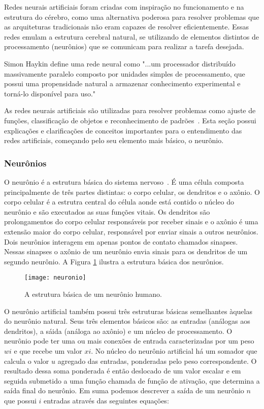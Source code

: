 Redes neurais artificiais foram criadas com inspiração no funcionamento e na estrutura do cérebro, como uma alternativa poderosa para resolver problemas que as arquiteturas tradicionais não eram capazes de resolver eficientemente. Essas redes emulam a estrutura cerebral natural, se utilizando de elementos distintos de processamento (neurônios) que se comunicam para realizar a tarefa desejada. 

Simon Haykin define uma rede neural como "...um processador distribuído massivamente paralelo composto por unidades simples de processamento, que possui uma propensidade natural a armazenar conhecimento experimental e torná-lo disponível para uso."

As redes neurais artificiais são utilizadas para resolver problemas como ajuste de funções, classificação de objetos e reconhecimento de padrões~\cite{kohonen1990self}. Esta seção possui explicações e clarificações de conceitos importantes para o entendimento das redes artificiais, começando pelo seu elemento mais básico, o neurônio.

\subsubsection{Neurônios}

O neurônio é a estrutura básica do sistema nervoso~\cite{chiras2013human}. É uma célula composta principalmente de três partes distintas: o corpo celular, os dendritos e o axônio. O corpo celular é a estrutra central do célula aonde está contido o núcleo do neurônio e são executados as suas funções vitais. Os dendritos são prolongamentos do corpo celular responsáveis por receber sinais e o axônio é uma extensão maior do corpo celular, responsável por enviar sinais a outros neurônios. Dois neurônios interagem em apenas  pontos de contato chamados sinapses. Nessas sinapses o axônio de um neurônio envia sinais para os dendritos de um segundo neurônio. A Figura \ref{fig:neuronio} ilustra a estrutura básica dos neurônios.

\begin{figure}
\centering
\texttt{[image: neuronio]}
\caption[A estrutura básica de um neurônio humano.]{A estrutura básica de um neurônio humano.\protect\footnotemark}
\label{fig:neuronio}
\centering
\end{figure}

O neurônio artificial também possui três estruturas básicas semelhantes àquelas do neurônio natural. Seus três elementos básicos são: as entradas (análogas aos dendritos), a sáida (análoga ao axônio) e um núcleo de processamento. 
O neurônio pode ter uma ou mais conexões de entrada caracterizadas por um peso $wi$ e que recebe um valor $xi$. No núcleo do neurônio artificial há um somador que calcula o valor $u$ agregado das entradas, ponderadas pelo peso correspondente. O resultado dessa soma ponderada é então deslocado de um valor escalar e em seguida submetido a uma função chamada de função de ativação, que determina a saída final do neurônio. Em suma podemos descrever a saída de um neurônio $n$ que possui $i$ entradas através das seguintes equações:

